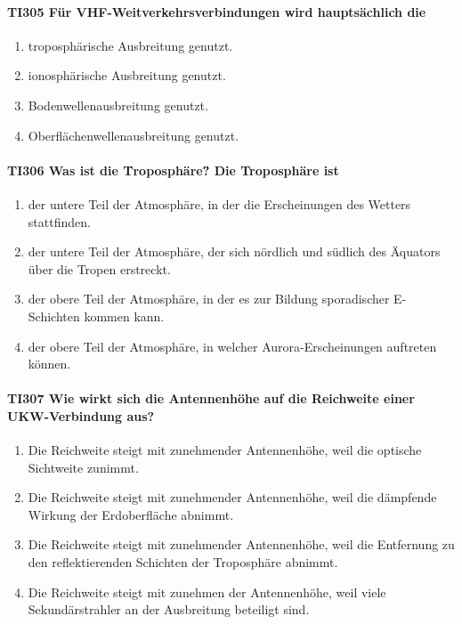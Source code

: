 \documentclass[8pt]{article}
\begin{document}
\paragraph*{TI305 Für VHF-Weitverkehrsverbindungen wird hauptsächlich die}
\begin{enumerate}[nolistsep,label=\Alph*]
\item troposphärische Ausbreitung genutzt.
\item ionosphärische Ausbreitung genutzt.
\item Bodenwellenausbreitung genutzt.
\item Oberflächenwellenausbreitung genutzt.
\end{enumerate}

\paragraph*{TI306 Was ist die \"Troposphäre\"? Die Troposphäre ist}
\begin{enumerate}[nolistsep,label=\Alph*]
\item der untere Teil der Atmosphäre, in der die Erscheinungen des Wetters stattfinden.
\item der untere Teil der Atmosphäre, der sich nördlich und südlich des Äquators über die Tropen erstreckt.
\item der obere Teil der Atmosphäre, in der es zur Bildung sporadischer E-Schichten kommen kann.
\item der obere Teil der Atmosphäre, in welcher Aurora-Erscheinungen auftreten können.
\end{enumerate}

\paragraph*{TI307 Wie wirkt sich die Antennenhöhe auf die Reichweite einer UKW-Verbindung aus?} 
\begin{enumerate}[nolistsep,label=\Alph*]
\item Die Reichweite steigt mit zunehmender Antennenhöhe, weil die optische Sichtweite zunimmt. 
\item Die Reichweite steigt mit zunehmender Antennenhöhe, weil die dämpfende Wirkung der Erdoberfläche abnimmt.
\item Die Reichweite steigt mit zunehmender Antennenhöhe, weil die Entfernung zu den reflektierenden Schichten der Troposphäre abnimmt.
\item Die Reichweite steigt mit zunehmen der Antennenhöhe, weil viele Sekundärstrahler an der Ausbreitung beteiligt sind.
\end{enumerate}
\end{document}
